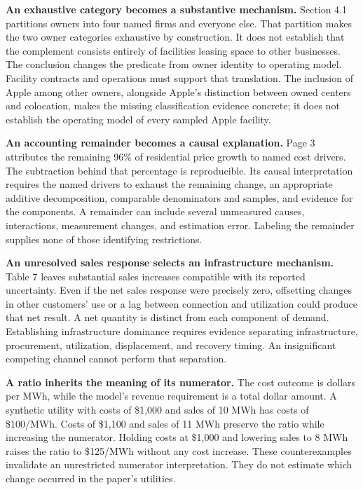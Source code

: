 \textbf{An exhaustive category becomes a substantive mechanism.} Section
4.1 partitions owners into four named firms and everyone else. That
partition makes the two owner categories exhaustive by construction. It
does not establish that the complement consists entirely of facilities
leasing space to other businesses. The conclusion changes the predicate
from owner identity to operating model. Facility contracts and
operations must support that translation. The inclusion of Apple among
other owners, alongside Apple's distinction between owned centers and
colocation, makes the missing classification evidence concrete; it does
not establish the operating model of every sampled Apple facility.

\textbf{An accounting remainder becomes a causal explanation.} Page 3
attributes the remaining 96\% of residential price growth to named cost
drivers. The subtraction behind that percentage is reproducible. Its
causal interpretation requires the named drivers to exhaust the
remaining change, an appropriate additive decomposition, comparable
denominators and samples, and evidence for the components. A remainder
can include several unmeasured causes, interactions, measurement
changes, and estimation error. Labeling the remainder supplies none of
those identifying restrictions.

\textbf{An unresolved sales response selects an infrastructure
mechanism.} Table 7 leaves substantial sales increases compatible with
its reported uncertainty. Even if the net sales response were precisely
zero, offsetting changes in other customers' use or a lag between
connection and utilization could produce that net result. A net quantity
is distinct from each component of demand. Establishing infrastructure
dominance requires evidence separating infrastructure, procurement,
utilization, displacement, and recovery timing. An insignificant
competing channel cannot perform that separation.

\textbf{A ratio inherits the meaning of its numerator.} The cost outcome
is dollars per MWh, while the model's revenue requirement is a total
dollar amount. A synthetic utility with costs of \$1,000 and sales of 10
MWh has costs of \$100/MWh. Costs of \$1,100 and sales of 11 MWh
preserve the ratio while increasing the numerator. Holding costs at
\$1,000 and lowering sales to 8 MWh raises the ratio to \$125/MWh
without any cost increase. These counterexamples invalidate an
unrestricted numerator interpretation. They do not estimate which change
occurred in the paper's utilities.

